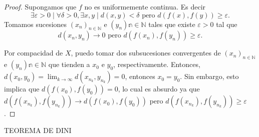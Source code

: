 \begin{proof}
	Supongamos que $f$ no es uniformemente continua. Es decir
	\begin{equation*}
		\exists \varepsilon > 0 \mid \forall \delta > 0, \exists x, y \mid d(x, y) < \delta \text{ pero } d(f(x), f(y)) \geq \varepsilon.
	\end{equation*}
	Tomamos sucesiones $(x_n)_{n \in \mathbb{N}}$ e $(y_n)\mathbb{n \in \mathbb{N}}$ tales que existe $\varepsilon > 0$ tal que
	\begin{equation*}
		d(x_n, y_n) \to 0 \text{ pero } d(f(x_n), f(y_n)) \geq \varepsilon.
	\end{equation*}

	Por compacidad de $X$, puedo tomar dos subsucesiones convergentes de $(x_n)_{n \in \mathbb{N}}$ e $(y_n)\mathbb{n \in \mathbb{N}}$ que tienden a $x_0$ e $y_0$, respectivamente. Entonces, $d(x_0, y_0) = \lim_{k \to \infty} d(x_{n_k}, y_{n_k}) = 0$, entonces $x_0 = y_0$. Sin embargo, esto implica que $d(f(x_0), f(y_0)) = 0$, lo cual es absurdo ya que $d(f(x_{n_k}), f(y_{n_k})) \to d(f(x_0), f(y_0))$ pero $d(f(x_{n_k}), f(y_{n_k})) \geq \varepsilon$.
\end{proof}

\begin{center}
	\color{red} TEOREMA DE DINI
\end{center}

